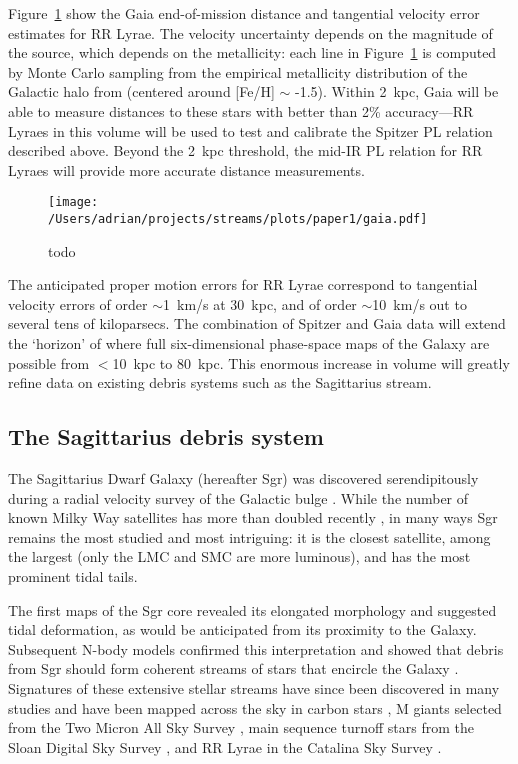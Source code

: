 \documentclass[preprint]{aastex}
\begin{document}
Figure~\ref{fig:gaia_errors} show the Gaia end-of-mission distance and
tangential velocity error estimates for RR Lyrae. The velocity uncertainty depends on the magnitude of the source, which depends on the metallicity: each line in Figure~\ref{fig:gaia_errors} is computed by Monte Carlo sampling from the empirical metallicity distribution of the Galactic halo from \cite{ivezic2008} (centered around [Fe/H] $\sim$ -1.5). Within 2~kpc, Gaia
will be able to measure distances to these stars with better than 2\%
accuracy---RR Lyraes in this volume will be used to test and calibrate
the Spitzer PL relation described above. Beyond the 2~kpc threshold,
the mid-IR PL relation for RR Lyraes will provide more accurate
distance measurements.

\begin{figure}[h]
\begin{center}
\texttt{[image: /Users/adrian/projects/streams/plots/paper1/gaia.pdf]}
\caption{ todo }\label{fig:gaia_errors}
\end{center}
\end{figure}

The anticipated proper motion errors for RR Lyrae correspond to
tangential velocity errors of order $\sim$1~km/s at 30~kpc, and of
order $\sim$10~km/s out to several tens of kiloparsecs. The
combination of Spitzer and Gaia data will extend the `horizon' of
where full six-dimensional phase-space maps of the Galaxy are possible
from $<$10~kpc to 80~kpc. This enormous increase in volume will greatly refine
data on existing debris systems such as the Sagittarius stream.

\subsection{The Sagittarius debris system}
\label{sec:sgr}
The Sagittarius Dwarf Galaxy (hereafter Sgr) was discovered
serendipitously during a radial velocity survey of the Galactic bulge
\citep{ibata1994}. While the number of known Milky Way satellites has
more than doubled recently \citep[e.g.,][]{mcconnachie2012}, in many
ways Sgr remains the most studied and most intriguing: it is the
closest satellite, among the largest (only the LMC and SMC are more
luminous), and has the most prominent tidal tails.

The first maps of the Sgr core \citep{ibata1994, ibata1995} revealed
its elongated morphology and suggested tidal deformation, as would be
anticipated from its proximity to the Galaxy. Subsequent N-body models
confirmed this interpretation \citep{velazquez1995} and showed that
debris from Sgr should form coherent streams of stars that encircle
the Galaxy \citep{johnston1995}. Signatures of these extensive stellar
streams have since been discovered in many studies and have been
mapped across the sky in carbon stars \citep{totten1998}, M giants
selected from the Two Micron All Sky Survey \citep{majewski2003}, main
sequence turnoff stars from the Sloan Digital Sky Survey
\citep{belokurov2006}, and RR Lyrae in the Catalina Sky Survey
\citep{drake2013}.
\end{document}
